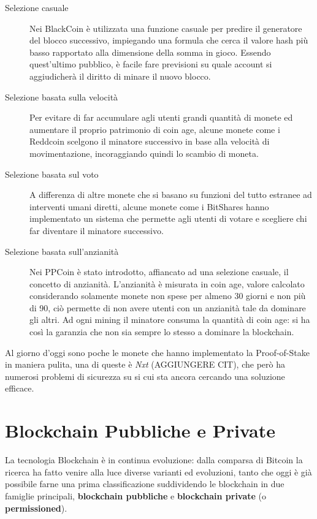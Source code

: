 \begin{description}
  \item[Selezione casuale] Nei BlackCoin è utilizzata una funzione casuale per predire il generatore del blocco successivo, impiegando una formula che cerca il valore hash più basso rapportato alla dimensione della somma in gioco. Essendo quest'ultimo pubblico, è facile fare previsioni su quale account si aggiudicherà il diritto di minare il nuovo blocco.
  \item[Selezione basata sulla velocità] Per evitare di far accumulare agli utenti grandi quantità di monete ed aumentare il proprio patrimonio di coin age, alcune monete come i Reddcoin scelgono il minatore successivo in base alla velocità di movimentazione, incoraggiando quindi lo scambio di moneta.
  \item[Selezione basata sul voto] A differenza di altre monete che si basano su funzioni del tutto estranee ad interventi umani diretti, alcune monete come i BitShares hanno implementato un sistema che permette agli utenti di votare e scegliere chi far diventare il minatore successivo.
  \item[Selezione basata sull'anzianità] Nei PPCoin è stato introdotto, affiancato ad una selezione casuale, il concetto di anzianità. L'anzianità è misurata in coin age, valore calcolato considerando solamente monete non spese per almeno 30 giorni e non più di 90, ciò permette di non avere utenti con un anzianità tale da dominare gli altri. Ad ogni mining il minatore consuma la quantità di coin age: si ha così la garanzia che non sia sempre lo stesso a dominare la blockchain.
\end{description}

Al giorno d'oggi sono poche le monete che hanno implementato la Proof-of-Stake in maniera pulita, una di queste è \textit{Nxt} (AGGIUNGERE CIT), che però ha numerosi problemi di sicurezza su si cui sta ancora cercando una soluzione efficace.

\section{Blockchain Pubbliche e Private}
La tecnologia Blockchain è in continua evoluzione: dalla comparsa di Bitcoin la ricerca ha fatto venire alla luce diverse varianti ed evoluzioni, tanto che oggi è già possibile farne una prima classificazione suddividendo le blockchain in due famiglie principali, \textbf{blockchain pubbliche} e \textbf{blockchain private} (o \textbf{permissioned}).

